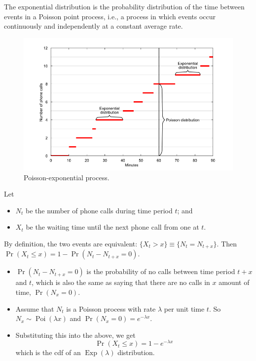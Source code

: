 \documentclass[
]{book}
\providecommand{\tightlist}{%
  \setlength{\itemsep}{0pt}\setlength{\parskip}{0pt}}
\DeclareMathOperator{\Pois}{Poi}
\DeclareMathOperator{\Exp}{Exp}
\theoremstyle{definition}
\theoremstyle{definition}
\theoremstyle{definition}
\theoremstyle{definition}
\theoremstyle{remark}
\begin{document}
The exponential distribution is the probability distribution of the time between events in a Poisson point process, i.e., a process in which events occur continuously and independently at a constant average rate.

\begin{figure}

{\centering \includegraphics[width=0.9\linewidth]{figure/exp_poisson_process} 

}

\caption{Poisson-exponential process.}\label{fig:exppoissonprocess}
\end{figure}

Let

\begin{itemize}
\tightlist
\item
  \(N_t\) be the number of phone calls during time period \(t\); and
\item
  \(X_t\) be the waiting time until the next phone call from one at \(t\).
\end{itemize}

By definition, the two events are equivalent: \(\{X_t > x \} \equiv \{N_t = N_{t+x}\}\).
Then \(\Pr(X_t \leq x) = 1 - \Pr(N_t - N_{t+x}=0)\).

\begin{itemize}
\tightlist
\item
  \(\Pr(N_t - N_{t+x}=0)\) is the probability of no calls between time period \(t+x\) and \(t\), which is also the same as saying that there are no calls in \(x\) amount of time, \(\Pr(N_x=0)\).
\item
  Assume that \(N_t\) is a Poisson process with rate \(\lambda\) per unit time \(t\). So \(N_x \sim \Pois(\lambda x)\) and \(\Pr(N_x=0) = e^{-\lambda x}\).
\item
  Substituting this into the above, we get
  \[
  \Pr(X_t \leq x) = 1 - e^{-\lambda x}
  \]
  which is the cdf of an \(\Exp(\lambda)\) distribution.
\end{itemize}
\end{document}
